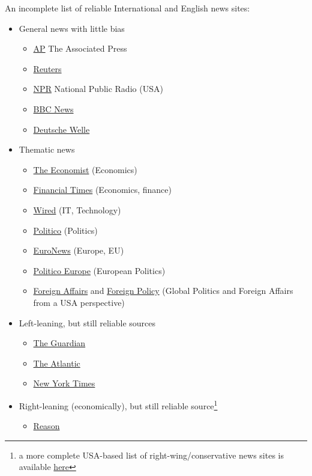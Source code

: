 \documentclass{article}
\begin{document}
An incomplete list of reliable International and English news sites:
\begin{itemize}
\item General news with little bias
\begin{itemize}
    \item \href{https://apnews.com/}{AP} The Associated Press
    \item \href{https://www.reuters.com/}{Reuters}
    \item \href{https://www.npr.org/}{NPR} National Public Radio (USA)
    \item \href{https://www.bbc.com/news}{BBC News}
    \item \href{https://www.dw.com/en/}{Deutsche Welle}
\end{itemize}
\item Thematic news
\begin{itemize}
    \item \href{https://www.economist.com/}{The Economist} (Economics)
    \item \href{https://www.ft.com/}{Financial Times} (Economics, finance)
    \item \href{https://www.wired.com/}{Wired} (IT, Technology)
    \item \href{https://www.politico.com/}{Politico} (Politics)
    \item \href{https://www.euronews.com/}{EuroNews} (Europe, EU)
    \item \href{https://www.politico.eu/}{Politico Europe} (European Politics)
    \item \href{https://www.foreignaffairs.com/}{Foreign Affairs} and \href{https://foreignpolicy.com/}{Foreign Policy} (Global Politics and Foreign Affairs from a USA perspective)
\end{itemize}
\item Left-leaning, but still reliable sources
\begin{itemize}
    \item \href{https://www.theguardian.com/}{The Guardian}
    \item \href{https://www.theatlantic.com/}{The Atlantic}
    \item \href{https://www.nytimes.com/}{New York Times}
\end{itemize}
\item Right-leaning (economically), but still reliable source\footnote{a more complete USA-based list of right-wing/conservative news sites is available \href{https://techpresident.com/best-conservative-news-sites/}{here}}
\begin{itemize}
    \item \href{https://reason.com/}{Reason}
\end{itemize}
\end{itemize}
\end{document}
